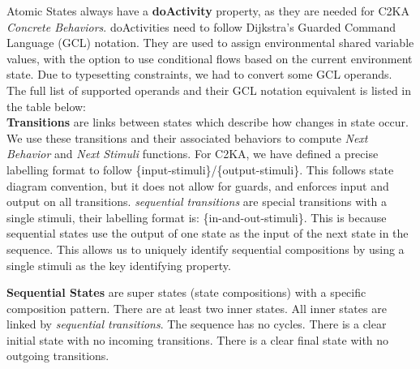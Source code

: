 \documentclass[11pt]{article}
\begin{document}
    Atomic States always have a \textbf{doActivity} property,
    as they are needed for C2KA \textit{Concrete Behaviors}.
    doActivities need to follow Dijkstra's Guarded Command Language (GCL) notation.
    They are used to assign environmental shared variable values,
    with the option to use conditional flows based on the current environment state.
    Due to typesetting constraints, we had to convert some GCL operands.
    The full list of supported operands and their GCL notation equivalent is listed in the table below:
    \\

    \textbf{Transitions} are links between states which describe how changes in state occur.
    We use these transitions and their associated behaviors to compute \textit{Next Behavior} and \textit{Next Stimuli} functions.
    For C2KA, we have defined a precise labelling format to follow \{input-stimuli\}/\{output-stimuli\}.
    This follows state diagram convention, but it does not allow for guards,
    and enforces input and output on all transitions.
    \textit{sequential transitions} are special transitions with a single stimuli, their labelling format is: \{in-and-out-stimuli\}.
    This is because sequential states use the output of one state as the input of the next state in the sequence.
    This allows us to uniquely identify sequential compositions by using a single stimuli as the key identifying property.

    \textbf{Sequential States} are super states (state compositions) with a specific composition pattern.
    There are at least two inner states.
    All inner states are linked by \textit{sequential transitions}.
    The sequence has no cycles.
    There is a clear initial state with no incoming transitions.
    There is a clear final state with no outgoing transitions.


\end{document}
